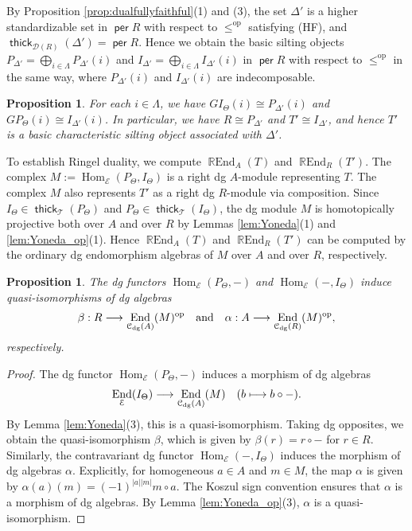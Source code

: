 \documentclass[a4paper,reqno,11pt]{amsart}
\numberwithin{equation}{section}
\newtheorem{proposition}[theorem]{Proposition}
\theoremstyle{definition}
\newcommand{\C}{\mathcal{C}}
\newcommand{\D}{\mathcal{D}}
\newcommand{\E}{\mathcal{E}}
\newcommand{\T}{\mathcal{T}}
\newcommand{\bte}{\Theta}
\newcommand{\bde}{\Delta}
\newcommand{\lto}{\longrightarrow}
\newcommand{\op}{\mathrm{op}}
\DeclareMathOperator{\thick}{\mathsf{thick}}
\DeclareMathOperator{\per}{\mathsf{per}}
\DeclareMathOperator{\End}{End}
\DeclareMathOperator{\REnd}{\mathbb{R}End}
\DeclareMathOperator{\Hom}{Hom}
\newcommand{\dgmod}{\C_{\mathrm{dg}}}
\begin{document}
By Proposition \ref{prop:dualfullyfaithful}(1) and (3), the set $\bde'$ is a higher standardizable set in $\per R$ with respect to $\leq^{\op}$ satisfying (HF), and $\thick_{\D(R)}(\bde')=\per R$.
Hence we obtain the basic silting objects $P_{\bde'}=\bigoplus_{i\in\Lambda}P_{\bde'}(i)$ and $I_{\bde'}=\bigoplus_{i\in\Lambda}I_{\bde'}(i)$ in $\per R$ with respect to $\leq^{\op}$ in the same way, where $P_{\bde'}(i)$ and $I_{\bde'}(i)$ are indecomposable.

\begin{proposition}\label{prop:dual-silting}
For each $i\in\Lambda$, we have $GI_{\bte}(i)\cong P_{\bde'}(i)$ and $GP_{\bte}(i)\cong I_{\bde'}(i)$.
In particular, we have $R\cong P_{\bde'}$ and $T'\cong I_{\bde'}$, and hence $T'$ is a basic characteristic silting object associated with $\bde'$.
\end{proposition}

To establish Ringel duality, we compute $\REnd_{A}(T)$ and $\REnd_{R}(T')$.
The complex $M:=\Hom_{\E}(P_{\bte},I_{\bte})$ is a right dg $A$-module representing $T$.
The complex $M$ also represents $T'$ as a right dg $R$-module via composition.
Since $I_{\bte}\in\thick_{\T}(P_{\bte})$ and $P_{\bte}\in\thick_{\T}(I_{\bte})$, the dg module $M$ is homotopically projective both over $A$ and over $R$ by Lemmas \ref{lem:Yoneda}(1) and \ref{lem:Yoneda_op}(1).
Hence $\REnd_{A}(T)$ and $\REnd_{R}(T')$ can be computed by the ordinary dg endomorphism algebras of $M$ over $A$ and over $R$, respectively.

\begin{proposition}\label{prop:double-duality}
The dg functors $\Hom_{\E}(P_{\bte},-)$ and $\Hom_{\E}(-,I_{\bte})$ induce quasi-isomorphisms of dg algebras
\begin{align}
\beta:R\lto\End_{\dgmod(A)}(M)^{\op} \quad\text{and}\quad \alpha:A\lto\End_{\dgmod(R)}(M)^{\op},\notag
\end{align}
respectively.
\end{proposition}
\begin{proof}
The dg functor $\Hom_{\E}(P_{\bte},-)$ induces a morphism of dg algebras
\begin{align}
\End_{\E}(I_{\bte})\lto\End_{\dgmod(A)}(M)\quad(b\longmapsto b\circ -).\notag
\end{align}
By Lemma \ref{lem:Yoneda}(3), this is a quasi-isomorphism.
Taking dg opposites, we obtain the quasi-isomorphism $\beta$, which is given by $\beta(r)=r\circ-$ for $r\in R$.
Similarly, the contravariant dg functor $\Hom_{\E}(-,I_{\bte})$ induces the morphism of dg algebras $\alpha$.
Explicitly, for homogeneous $a\in A$ and $m\in M$, the map $\alpha$ is given by $\alpha(a)(m)=(-1)^{|a||m|}m\circ a$.
The Koszul sign convention ensures that $\alpha$ is a morphism of dg algebras.
By Lemma \ref{lem:Yoneda_op}(3), $\alpha$ is a quasi-isomorphism.
\end{proof}
\end{document}
